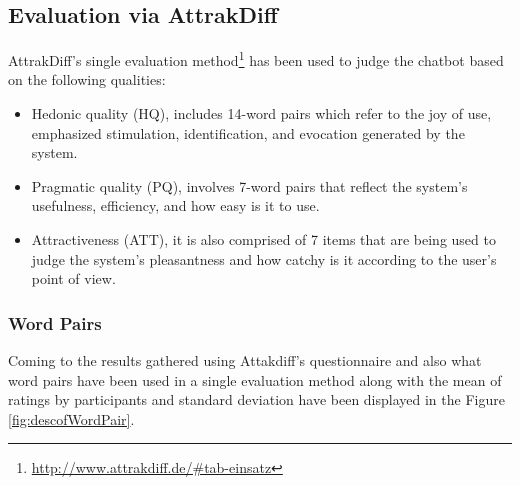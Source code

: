 \subsection{Evaluation via AttrakDiff}
AttrakDiff's single evaluation method\footnote{\url{http://www.attrakdiff.de/\#tab-einsatz}} has been used to judge the chatbot based on the following qualities:
\begin{itemize}
    \item Hedonic quality (HQ), includes 14-word pairs which refer to the joy of use, emphasized stimulation, identification, and evocation generated by the system.
    \item Pragmatic quality (PQ), involves 7-word pairs that reflect the system's usefulness, efficiency, and how easy is it to use.
    \item Attractiveness (ATT), it is also comprised of 7 items that are being used to judge the system's pleasantness and how catchy is it according to the user's point of view.
\end{itemize} 

\subsubsection*{Word Pairs}
Coming to the results gathered using Attakdiff's questionnaire and also what word pairs have been used in a single evaluation method along with the mean of ratings by participants and standard deviation have been displayed in the Figure \ref{fig:descofWordPair}.

